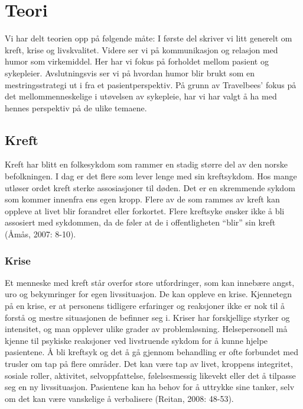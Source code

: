 \chapter{Teori}

Vi har delt teorien opp på følgende måte: I første del skriver vi litt generelt
om kreft, krise og livskvalitet. Videre ser vi på kommunikasjon og relasjon med
humor som virkemiddel. Her har vi fokus på forholdet mellom pasient og
sykepleier. Avslutningsvis ser vi på hvordan humor blir brukt som en
mestringsstrategi ut i fra et pasientperspektiv. På grunn av Travelbees’ fokus
på det mellommenneskelige i utøvelsen av sykepleie, har vi har valgt å ha med
hennes perspektiv på de ulike temaene.

\section{Kreft}

Kreft har blitt en folkesykdom som rammer en stadig større del av den norske
befolkningen.  I dag er det flere som lever lenge med sin kreftsykdom. Hos
mange utløser ordet kreft sterke assosiasjoner til døden. Det er en skremmende
sykdom som kommer innenfra ens egen kropp. Flere av de som rammes av kreft kan
oppleve at livet blir forandret eller forkortet. Flere kreftsyke ønsker ikke å
bli assosiert med sykdommen, da de føler at de i offentligheten “blir” sin
kreft (Åmås, 2007: 8-10).

\subsection{Krise}

Et menneske med kreft står overfor store utfordringer, som kan innebære angst,
uro og bekymringer for egen livssituasjon. De kan oppleve en krise. Kjennetegn
på en krise, er at personens tidligere erfaringer og reaksjoner ikke er nok til
å forstå og mestre situasjonen de befinner seg i. Kriser har forskjellige
styrker og intensitet, og man opplever ulike grader av problemløsning.
Helsepersonell må kjenne til psykiske reaksjoner ved livstruende sykdom for å
kunne hjelpe pasientene. Å bli kreftsyk og det å gå gjennom behandling er ofte
forbundet med trusler om tap på flere områder. Det kan være tap av livet,
kroppens integritet, sosiale roller, aktivitet, selvoppfattelse, følelsesmessig
likevekt eller det å tilpasse seg en ny livssituasjon. Pasientene kan ha behov
for å uttrykke sine tanker, selv om det kan være vanskelige å verbalisere
(Reitan, 2008: 48-53).

